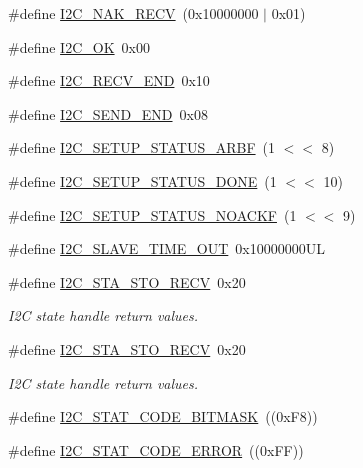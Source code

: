 \begin{DoxyCompactItemize}
\item 
\#define \hyperlink{group__I2C__17XX__40XX_ga01f7ced141c84fc0299e0a509bfcc8ce}{I2\+C\+\_\+\+N\+A\+K\+\_\+\+R\+E\+CV}~(0x10000000 $\vert$ 0x01)
\item 
\#define \hyperlink{group__I2C__17XX__40XX_ga57d0c95ccd7c129288743e9674a9e96d}{I2\+C\+\_\+\+OK}~0x00
\item 
\#define \hyperlink{group__I2C__17XX__40XX_gac6c3ac5b11a68d4ff63b01e7aa4bc121}{I2\+C\+\_\+\+R\+E\+C\+V\+\_\+\+E\+ND}~0x10
\item 
\#define \hyperlink{group__I2C__17XX__40XX_ga758db89a42044992cfb80d0f6f55261d}{I2\+C\+\_\+\+S\+E\+N\+D\+\_\+\+E\+ND}~0x08
\item 
\#define \hyperlink{group__I2C__17XX__40XX_gae90c077796281121b65b80b661a23062}{I2\+C\+\_\+\+S\+E\+T\+U\+P\+\_\+\+S\+T\+A\+T\+U\+S\+\_\+\+A\+R\+BF}~(1 $<$$<$ 8)
\item 
\#define \hyperlink{group__I2C__17XX__40XX_gaefbb25ca99e199765e7dcdd6ef343590}{I2\+C\+\_\+\+S\+E\+T\+U\+P\+\_\+\+S\+T\+A\+T\+U\+S\+\_\+\+D\+O\+NE}~(1 $<$$<$ 10)
\item 
\#define \hyperlink{group__I2C__17XX__40XX_ga90a37b470118d82b9682cfc2e0b4de84}{I2\+C\+\_\+\+S\+E\+T\+U\+P\+\_\+\+S\+T\+A\+T\+U\+S\+\_\+\+N\+O\+A\+C\+KF}~(1 $<$$<$ 9)
\item 
\#define \hyperlink{group__I2C__17XX__40XX_ga33116b352c72ef28879812c66387f17a}{I2\+C\+\_\+\+S\+L\+A\+V\+E\+\_\+\+T\+I\+M\+E\+\_\+\+O\+UT}~0x10000000\+UL
\item 
\#define \hyperlink{group__I2C__17XX__40XX_ga6ed81fd3a1ae05f1fbf96525f1520cd3}{I2\+C\+\_\+\+S\+T\+A\+\_\+\+S\+T\+O\+\_\+\+R\+E\+CV}~0x20
\begin{DoxyCompactList}\small\item\em I2C state handle return values. \end{DoxyCompactList}\item 
\#define \hyperlink{group__I2C__17XX__40XX_ga6ed81fd3a1ae05f1fbf96525f1520cd3}{I2\+C\+\_\+\+S\+T\+A\+\_\+\+S\+T\+O\+\_\+\+R\+E\+CV}~0x20
\begin{DoxyCompactList}\small\item\em I2C state handle return values. \end{DoxyCompactList}\item 
\#define \hyperlink{group__I2C__17XX__40XX_gafeb8b5f682a81a2cc32f6c4b720a5e1f}{I2\+C\+\_\+\+S\+T\+A\+T\+\_\+\+C\+O\+D\+E\+\_\+\+B\+I\+T\+M\+A\+SK}~((0x\+F8))
\item 
\#define \hyperlink{group__I2C__17XX__40XX_gacfbf48ab1ed4f43314f63898ac827925}{I2\+C\+\_\+\+S\+T\+A\+T\+\_\+\+C\+O\+D\+E\+\_\+\+E\+R\+R\+OR}~((0x\+F\+F))
$$
\end{DoxyCompactItemize}
